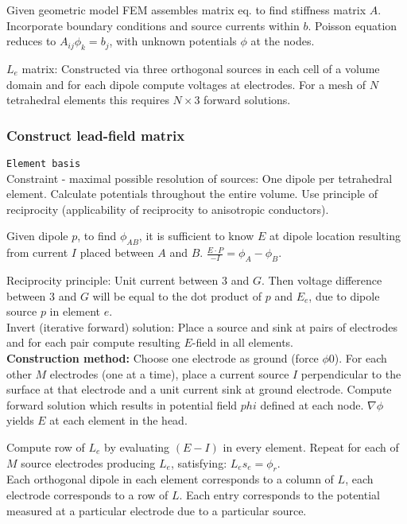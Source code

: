 Given geometric model FEM assembles matrix eq. to find stiffness matrix $A$. Incorporate boundary conditions and source currents within $b$.
Poisson equation reduces to $A_{ij}\phi_k = b_j$, with unknown potentials $\phi$ at the nodes.\vs

$L_e$ matrix: Constructed via three orthogonal sources in each cell of a volume domain and for each dipole compute voltages at electrodes. For a mesh of $N$ tetrahedral elements this requires $N\times 3$ forward solutions.\vs

\subsubsection{Construct lead-field matrix}
\verb!Element basis!\\
Constraint - maximal possible resolution of sources: One dipole per tetrahedral element. Calculate potentials throughout the entire volume. Use principle of reciprocity (applicability of reciprocity to anisotropic conductors).\vs

Given dipole $p$, to find $\phi_{AB}$, it is sufficient to know $E$ at dipole location resulting from current $I$ placed between $A$ and $B$. $\frac{E\cdot P}{-I} = \phi_A - \phi_B$.

Reciprocity principle: Unit current between 3 and $G$. Then voltage difference between 3 and $G$ will be equal to the dot product of $p$ and $E_e$, due to dipole source $p$ in element $e$.\\
Invert (iterative forward) solution: Place a source and sink at pairs of electrodes and for each pair compute resulting $E$-field in all elements.\\
\textbf{Construction method:} Choose one electrode as ground (force $\phi$\arr$0$). For each other $M$ electrodes (one at a time), place a current source $I$ perpendicular to the surface at that electrode and a unit current sink at ground electrode. Compute forward solution which results in potential field $phi$ defined at each node. $\nabla \phi$ yields $E$ at each element in the head. \vs

Compute row of $L_e$ by evaluating $(E-I)$ in every element. Repeat for each of $M$ source electrodes producing $L_e$, satisfying: $L_e s_e = \phi_r$.\\ Each orthogonal dipole in each element corresponds to a column of $L$, each electrode corresponds to a row of $L$. Each entry corresponds to the potential measured at a particular electrode due to a particular source.\vs


